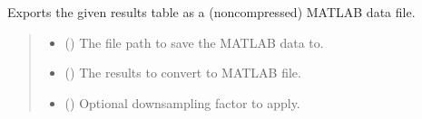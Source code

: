 \documentclass[letterpaper,10pt,english]{sphinxmanual}
\begin{document}
\begin{fulllineitems}
\label{\detokenize{modules/output/formats:qnav.output.formats.save_as_matlab}}
\pysigstartsignatures
{}
\pysigstopsignatures
\sphinxAtStartPar
Exports the given results table as a (non\sphinxhyphen{}compressed) MATLAB data file.
\begin{quote}\begin{description}
\begin{itemize}
\item {} 
\sphinxAtStartPar
{} () \textendash{} The file path to save the MATLAB data to.

\item {} 
\sphinxAtStartPar
{} ({\hyperref[\detokenize{modules/output/data:qnav.output.data.ResultsTable}]{}}) \textendash{} The results to convert to MATLAB file.

\item {} 
\sphinxAtStartPar
{} () \textendash{} Optional down\sphinxhyphen{}sampling factor to apply.

\end{itemize}

\end{description}\end{quote}

\end{fulllineitems}

\end{document}
